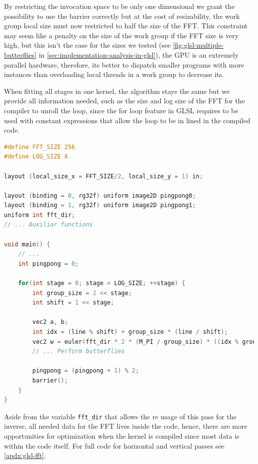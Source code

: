\documentclass[
  oneside,
  11pt, a4paper,
  footinclude=true,
  headinclude=true,
  cleardoublepage=empty
]{scrbook}
\begin{document}
By restricting the invocation space to be only one dimensional we grant the possibility to use the barrier correctly but at the cost of resizability, the work group local size must now restricted to half the size of the FFT. This constraint may seem like a penalty on the size of the work group if the FFT size is very high, but this isn't the case for the sizes we tested (see \autoref{fig:glsl-multiple-butterflies} in \autoref{sec:implementation-analysis-in-glsl}), the GPU is an extremely parallel hardware, therefore, its better to dispatch smaller programs with more instances than overloading local threads in a work group to decrease its.
\newline 

When fitting all stages in one kernel, the algorithm stays the same but we provide all information needed, such as the size and log size of the FFT for the compiler to unroll the loop, since the for loop feature in GLSL requires to be used with constant expressions that allow the loop to be in lined in the compiled code.
\newline 

\begin{lstlisting}[language=C,caption={Unique pass structure for Cooley-Tukey}]
#define FFT_SIZE 256
#define LOG_SIZE 8

layout (local_size_x = FFT_SIZE/2, local_size_y = 1) in;

layout (binding = 0, rg32f) uniform image2D pingpong0;
layout (binding = 1, rg32f) uniform image2D pingpong1;
uniform int fft_dir;
// ... Auxiliar functions

void main() {
    // ...
    int pingpong = 0;
    
    for(int stage = 0; stage < LOG_SIZE; ++stage) {
        int group_size = 2 << stage;
        int shift = 1 << stage;

        vec2 a, b;
        int idx = (line % shift) + group_size * (line / shift);
        vec2 w = euler(fft_dir * 2 * (M_PI / group_size) * ((idx % group_size) % shift));
        // ... Perform butterflies

        pingpong = (pingpong + 1) % 2;
        barrier();
    }
}
\end{lstlisting}

Aside from the variable \texttt{fft\_dir} that allows the re usage of this pass for the inverse, all needed data for the FFT lives inside the code, hence, there are more opportunities for optimization when the kernel is compiled since most data is within the code itself. For full code for horizontal and vertical passes see \autoref{apdx:glsl-fft}.
\end{document}

